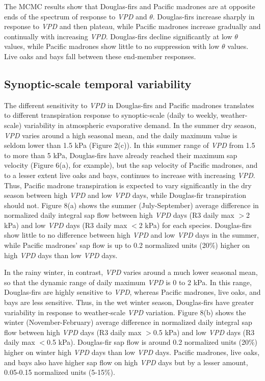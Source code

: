 The MCMC results show that Douglas-firs and Pacific madrones are at opposite ends of the spectrum of response to \textit{VPD} and $\theta$.  Douglas-firs increase sharply in response to \textit{VPD} and then plateau, while Pacific madrones increase gradually and continually with increasing \textit{VPD}.  Douglas-firs decline significantly at low $\theta$ values, while Pacific madrones show little to no suppression with low $\theta$ values.  Live oaks and bays fall between these end-member responses.

\subsection{Synoptic-scale temporal variability}
The different sensitivity to \textit{VPD} in Douglas-firs and Pacific madrones translates to different transpiration response to synoptic-scale (daily to weekly, weather-scale) variability in atmospheric evaporative demand.  In the summer dry season, \textit{VPD} varies around a high seasonal mean, and the daily maximum value is seldom lower than 1.5 kPa (Figure 2(c)).  In this summer range of \textit{VPD} from 1.5 to more than 5 kPa, Douglas-firs have already reached their maximum sap velocity (Figure 6(a), for example), but the sap velocity of Pacific madrones, and to a lesser extent live oaks and bays, continues to increase with increasing \textit{VPD}.  Thus, Pacific madrone transpiration is expected to vary significantly in the dry season between high \textit{VPD} and low \textit{VPD} days, while Douglas-fir transpiration should not.  Figure 8(a) shows the summer (July-September) average difference in normalized daily integral sap flow between high \textit{VPD} days (R3 daily max $>$2 kPa) and low \textit{VPD} days (R3 daily max $<$2 kPa) for each species.  Douglas-firs show little to no difference between high \textit{VPD} and low \textit{VPD} days in the summer, while Pacific madrones' sap flow is up to 0.2 normalized units (20\%) higher on high \textit{VPD} days than low \textit{VPD} days.

In the rainy winter, in contrast, \textit{VPD} varies around a much lower seasonal mean, so that the dynamic range of daily maximum \textit{VPD} is 0 to 2 kPa.  In this range, Douglas-firs are highly sensitive to \textit{VPD}, whereas Pacific madrones, live oaks, and bays are less sensitive.  Thus, in the wet winter season, Douglas-firs have greater variability in response to weather-scale \textit{VPD} variation.  Figure 8(b) shows the winter (November-February) average difference in normalized daily integral sap flow between high \textit{VPD} days (R3 daily max $>$0.5 kPa) and low \textit{VPD} days (R3 daily max $<$0.5 kPa).  Douglas-fir sap flow is around 0.2 normalized units (20\%) higher on winter high \textit{VPD} days than low \textit{VPD} days.  Pacific madrones, live oaks, and bays also have higher sap flow on high \textit{VPD} days but by a lesser amount, 0.05-0.15 normalized units (5-15\%).

